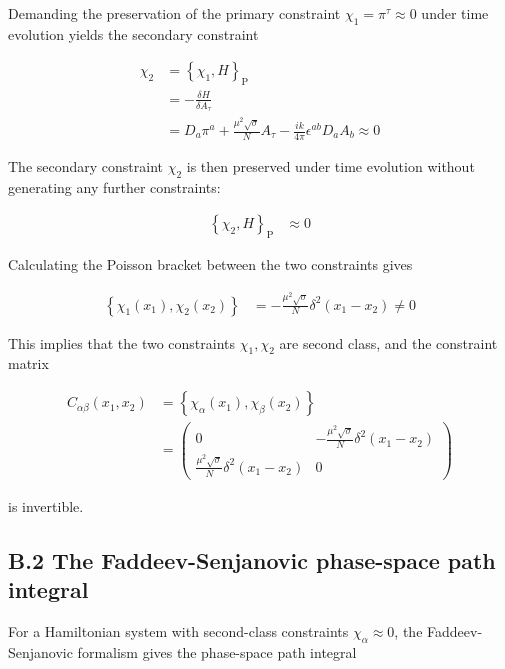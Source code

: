 Demanding the preservation of the primary constraint $\displaystyle{\chi _{1}=\pi ^{\tau}\approx 0}$ under time evolution yields the secondary constraint

\begin{align}
\chi _{2} & =\left\{\chi _{1},H\right\}_{\text{P}} \\
 & = -\frac{\delta H}{\delta A_{\tau}} \\
 & =D_{a}\pi ^{a}+\frac{\mu ^{2}\sqrt{ \sigma }}{N}A_{\tau}-\frac{ik}{4\pi}\epsilon ^{ab}D_{a}A_{b}\approx 0
\end{align}

The secondary constraint $\displaystyle{\chi _{2}}$ is then preserved under time evolution without generating any further constraints:

\begin{align}
\left\{\chi _{2},H\right\}_{\text{P}} & \approx 0
\end{align}

Calculating the Poisson bracket between the two constraints gives

\begin{align}
\left\{\chi _{1}(x_{1}),\chi _{2}(x_{2})\right\} & =-\frac{\mu ^{2}\sqrt{ \sigma }}{N}\delta ^{2}(x_{1}-x_{2})\neq 0
\end{align}

This implies that the two constraints $\displaystyle{\chi _{1},\chi _{2}}$ are second class, and the constraint matrix

\begin{align}
C_{\alpha \beta}(x_{1},x_{2}) & =\left\{\chi _{\alpha}(x_{1}),\chi _{\beta}(x_{2})\right\} \\
 & =\begin{pmatrix}
0 & -\frac{\mu ^{2}\sqrt{ \sigma }}{N}\delta ^{2}(x_{1}-x_{2}) \\
\frac{\mu ^{2}\sqrt{ \sigma }}{N}\delta ^{2}(x_{1}-x_{2}) & 0
 \end{pmatrix}
\end{align}

is invertible.

\subsection{B.2 The Faddeev-Senjanovic phase-space path integral}\label{subsec:fs-phase-space-path-integral}

For a Hamiltonian system with second-class constraints $\chi _{\alpha}\approx 0$, the Faddeev-Senjanovic formalism gives the phase-space path integral

